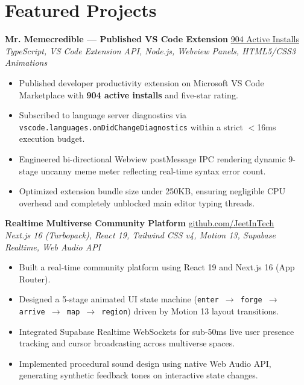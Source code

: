 \documentclass[10pt]{article}
\begin{document}
\section*{Featured Projects}
\textbf{Mr. Memecredible — Published VS Code Extension} \hfill \href{https://marketplace.visualstudio.com/items?itemName=SangramjeetGhosh.mr-memecredible}{904 Active Installs} \\
\textit{TypeScript, VS Code Extension API, Node.js, Webview Panels, HTML5/CSS3 Animations}
\begin{itemize}
    \item Published developer productivity extension on Microsoft VS Code Marketplace with \textbf{904 active installs} and five-star rating.
    \item Subscribed to language server diagnostics via \texttt{vscode.languages.onDidChangeDiagnostics} within a strict $<$16ms execution budget.
    \item Engineered bi-directional Webview postMessage IPC rendering dynamic 9-stage uncanny meme meter reflecting real-time syntax error count.
    \item Optimized extension bundle size under 250KB, ensuring negligible CPU overhead and completely unblocked main editor typing threads.
\end{itemize}

\vspace{1.5pt}
\textbf{Realtime Multiverse Community Platform} \hfill \href{https://github.com/JeetInTech/U---enter-the-multiverse}{github.com/JeetInTech} \\
\textit{Next.js 16 (Turbopack), React 19, Tailwind CSS v4, Motion 13, Supabase Realtime, Web Audio API}
\begin{itemize}
    \item Built a real-time community platform using React 19 and Next.js 16 (App Router).
    \item Designed a 5-stage animated UI state machine (\texttt{enter $\to$ forge $\to$ arrive $\to$ map $\to$ region}) driven by Motion 13 layout transitions.
    \item Integrated Supabase Realtime WebSockets for sub-50ms live user presence tracking and cursor broadcasting across multiverse spaces.
    \item Implemented procedural sound design using native Web Audio API, generating synthetic feedback tones on interactive state changes.
\end{itemize}
\end{document}

